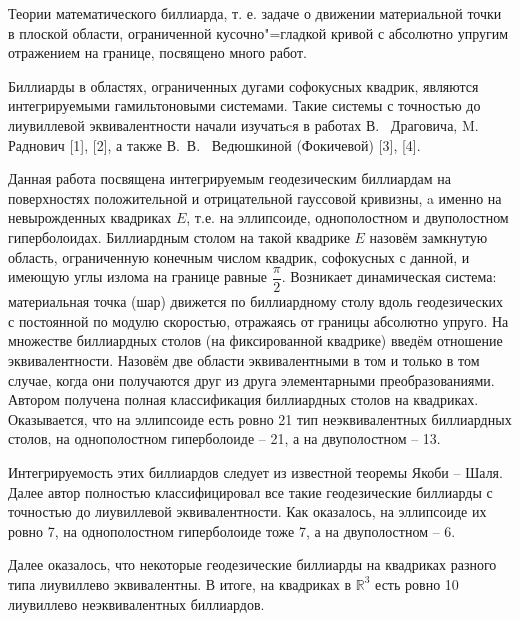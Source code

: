 \vzmscaption

Теории математического биллиарда, т. е. задаче о движении материальной
точки в плоской области, ограниченной кусочно"=гладкой кривой с абсолютно
упругим отражением на границе, посвящено много работ.

Биллиарды в областях, ограниченных дугами софокусных квадрик, являются интегрируемыми гамильтоновыми системами.
Такие системы с точностью до лиувиллевой эквивалентности начали изучатьcя
в работах В.~ Драговича, M.~ Раднович [1], [2], а также В.\, В.~ Ведюшкиной (Фокичевой) [3], [4].

Данная работа посвящена интегрируемым геодезическим биллиардам на поверхностях положительной и отрицательной гауссовой
кривизны, a именно на невырожденных квадриках $E$, т.е. на эллипсоиде, однополостном и двуполостном гиперболоидах.
Биллиардным столом на такой квадрике $E$ назовём замкнутую область,
ограниченную конечным числом квадрик, софокусных с данной, и имеющую углы излома на границе равные
$\dfrac{\pi}{2}$. Возникает динамическая система:
материальная точка (шар) движется по биллиардному столу
вдоль геодезических с постоянной по модулю скоростью, отражаясь от границы абсолютно упруго. На
множестве биллиардных столов (на фиксированной квадрике) введём отношение эквивалентности.
Назовём две области эквивалентными
в том и только в том случае, когда они получаются друг из друга элементарными преобразованиями.
Автором получена полная классификация биллиардных столов на квадриках. Оказывается, что
на эллипсоиде есть ровно 21 тип неэквивалентных биллиардных столов, на однополостном гиперболоиде -- 21, а на двуполостном -- 13.


Интегрируемость этих биллиардов следует из известной теоремы Якоби -- Шаля.
Далее автор полностью классифицировал все такие геодезические биллиарды с
точностью до лиувиллевой эквивалентности. Как оказалось, на эллипсоиде их ровно 7, на однополостном гиперболоиде тоже 7, а на двуполостном -- 6.

Далее оказалось, что некоторые геодезические биллиарды на квадриках разного типа лиувиллево эквивалентны.
В итоге, на квадриках в $\mathbb{R}^3$ есть ровно 10 лиувиллево неэквивалентных биллиардов.



